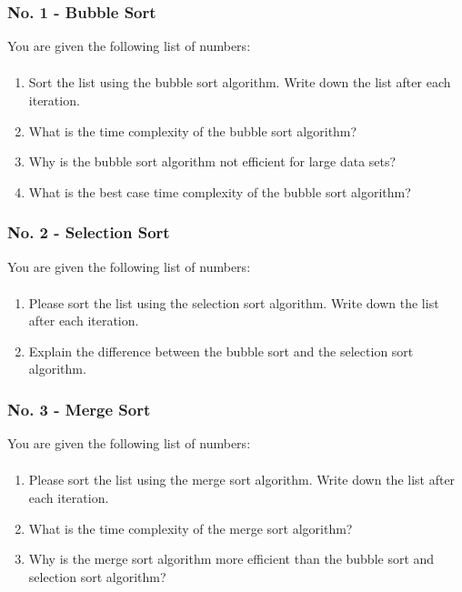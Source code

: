 \documentclass[10pt, oneside]{article}
\theoremstyle{remark}
\begin{document}
\subsubsection{No. 1 - Bubble Sort}
You are given the following list of numbers: 
\begin{align*}
  [5, 3, 8, 2, 1, 4, 7, 6]
\end{align*}
\begin{enumerate}
  \item Sort the list using the bubble sort algorithm. Write down the list after each iteration.
  \item What is the time complexity of the bubble sort algorithm?
  \item Why is the bubble sort algorithm not efficient for large data sets?
  \item What is the best case time complexity of the bubble sort algorithm?
\end{enumerate}

\subsubsection{No. 2 - Selection Sort}
You are given the following list of numbers:
\begin{align*}
  [12, 3, 5, 7, 1, 9, 4, 6]
\end{align*}
\begin{enumerate}
  \item Please sort the list using the selection sort algorithm. Write down the list after each iteration.
  \item Explain the difference between the bubble sort and the selection sort algorithm.  
\end{enumerate}

\subsubsection{No. 3 - Merge Sort}
You are given the following list of numbers:
\begin{align*}
  [8, 2, 4, 6, 3, 1, 5, 7]
\end{align*}
\begin{enumerate}
  \item Please sort the list using the merge sort algorithm. Write down the list after each iteration.
  \item What is the time complexity of the merge sort algorithm?
  \item Why is the merge sort algorithm more efficient than the bubble sort and selection sort algorithm?
\end{enumerate}
\end{document}

